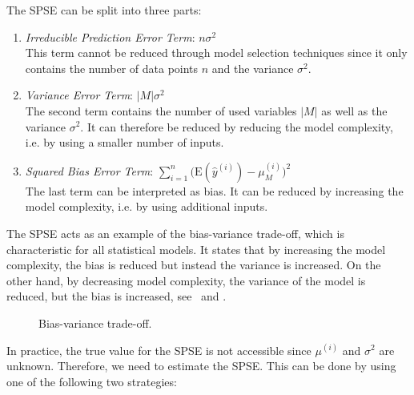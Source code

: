 The SPSE can be split into three parts:

\begin{enumerate}
	\item \emph{Irreducible Prediction Error Term}: $n\sigma^2$ \\
	This term cannot be reduced through model selection techniques since it only contains the number of data points $n$ and the variance $\sigma^2$.

	\item \emph{Variance Error Term}: $\vert M \vert \sigma^2$ \\
	The second term contains the number of used variables $\vert M \vert$ as well as the variance $\sigma^2$. It can therefore be reduced by reducing the model complexity, i.e. by using a smaller number of inputs.
	
	\item \emph{Squared Bias Error Term}: $\sum_{i=1}^{n} \big( \text{E}(\hat y^{(i)}) - \mu^{(i)}_M \big)^2$\\
	The last term can be interpreted as bias. It can be reduced by increasing the model complexity, i.e. by using additional inputs.
\end{enumerate}
%
The SPSE acts as an example of the bias-variance trade-off, which is characteristic for all statistical models. It states that by increasing the model complexity, the bias is reduced but instead the variance is increased. On the other hand, by decreasing model complexity, the variance of the model is reduced, but the bias is increased, see~ and \cite{bishop2006patternRecognition}.

\begin{figure}[H]
	\centering
	\caption{Bias-variance trade-off.}
	\label{fig:bv-trade-off}
\end{figure}
%
In practice, the true value for the SPSE is not accessible since $\mu^{(i)}$ and $\sigma^2$ are unknown. Therefore, we need to estimate the SPSE. This can be done by using one of the following two strategies:

